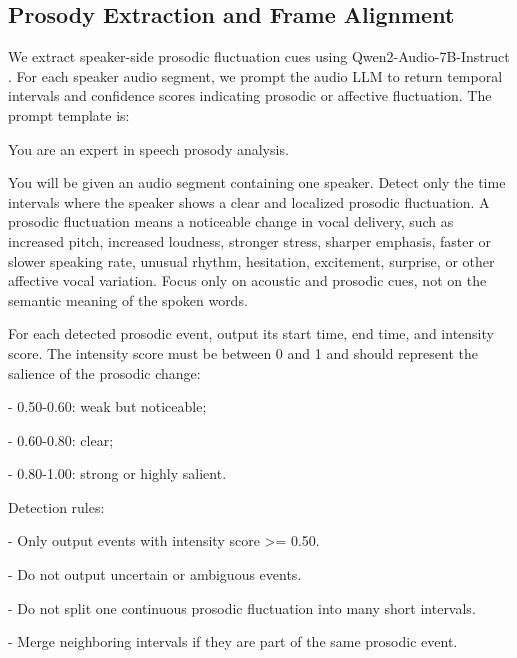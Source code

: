 \subsection{Prosody Extraction and Frame Alignment}  \label{app:prosody_extraction}

We extract speaker-side prosodic fluctuation cues using Qwen2-Audio-7B-Instruct \cite{Qwen2-Audio}. For each speaker audio segment, we prompt the audio LLM to return temporal intervals and confidence scores indicating prosodic or affective fluctuation. The prompt template is:

\begin{tcolorbox}[
    enhanced, 
    breakable, 
    colback=gray!10!white, 
    colframe=gray!40!black, 
    fontupper=\fontsize{8pt}{9pt}\selectfont\ttfamily,
    sharp corners, 
    boxrule=0.5pt, 
    arc=0pt,
]

You are an expert in speech prosody analysis.
\vspace{1em}

You will be given an audio segment containing one speaker. Detect only the time intervals where the speaker shows a clear and localized prosodic fluctuation. A prosodic fluctuation means a noticeable change in vocal delivery, such as increased pitch, increased loudness, stronger stress, sharper emphasis, faster or slower speaking rate, unusual rhythm, hesitation, excitement, surprise, or other affective vocal variation. Focus only on acoustic and prosodic cues, not on the semantic meaning of the spoken words.
\vspace{1em}

For each detected prosodic event, output its start time, end time, and intensity score. The intensity score must be between 0 and 1 and should represent the salience of the prosodic change:

- 0.50-0.60: weak but noticeable;

- 0.60-0.80: clear;

- 0.80-1.00: strong or highly salient.
\vspace{1em}

Detection rules:

- Only output events with intensity score >= 0.50.

- Do not output uncertain or ambiguous events.

- Do not split one continuous prosodic fluctuation into many short intervals.

- Merge neighboring intervals if they are part of the same prosodic event.


\end{tcolorbox}
